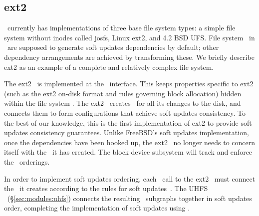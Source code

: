 \subsection{ext2}
\label{sec:using:ext2}

\Kudos\ currently has implementations of three base file system types: a simple
file system without inodes called josfs, Linux ext2, and 4.2 BSD UFS. File
system \modules\ in \Kudos\ are supposed to generate soft updates dependencies
by default; other dependency arrangements are achieved by transforming these.
We briefly describe ext2 as an example of a complete and relatively complex file
system.

The ext2 \module\ is implemented at the \LFS\ interface. This keeps properties
specific to ext2 (such as the ext2 on-disk format and rules governing block
allocation) hidden within the file system \module. The ext2 \module\ creates
\chdescs\ for all its changes to the disk, and connects them to form
configurations that achieve soft updates consistency. To the best of our
knowledge, this is the first implementation of ext2 to provide soft updates
consistency guarantees. Unlike FreeBSD's soft updates implementation, once the
dependencies have been hooked up, the ext2 \module\ no longer needs to concern
itself with the \chdescs\ it has created. The block device subsystem will track
and enforce the \chdesc\ orderings.

In order to implement soft updates ordering, each \LFS\ call to the ext2
\module\ must connect the \chdescs\ it creates according to the rules for soft
updates~\cite{ganger00soft}. The UHFS \module\ (\S\ref{sec:modules:uhfs})
connects the resulting \chdesc\ subgraphs together in soft updates order,
completing the implementation of soft updates using \chdescs.
